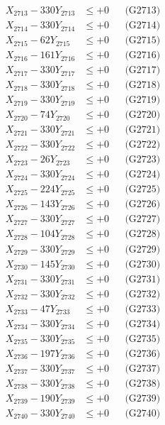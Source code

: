 \documentclass[a4paper,10pt]{article}
\begin{document}
{\begin{align}
X_{2713} - 330Y_{2713} &\leq +0 && \text{(G2713)} \\
X_{2714} - 330Y_{2714} &\leq +0 && \text{(G2714)} \\
X_{2715} - 62Y_{2715} &\leq +0 && \text{(G2715)} \\
X_{2716} - 161Y_{2716} &\leq +0 && \text{(G2716)} \\
X_{2717} - 330Y_{2717} &\leq +0 && \text{(G2717)} \\
X_{2718} - 330Y_{2718} &\leq +0 && \text{(G2718)} \\
X_{2719} - 330Y_{2719} &\leq +0 && \text{(G2719)} \\
X_{2720} - 74Y_{2720} &\leq +0 && \text{(G2720)} \\
\allowbreak
X_{2721} - 330Y_{2721} &\leq +0 && \text{(G2721)} \\
X_{2722} - 330Y_{2722} &\leq +0 && \text{(G2722)} \\
X_{2723} - 26Y_{2723} &\leq +0 && \text{(G2723)} \\
X_{2724} - 330Y_{2724} &\leq +0 && \text{(G2724)} \\
X_{2725} - 224Y_{2725} &\leq +0 && \text{(G2725)} \\
X_{2726} - 143Y_{2726} &\leq +0 && \text{(G2726)} \\
X_{2727} - 330Y_{2727} &\leq +0 && \text{(G2727)} \\
X_{2728} - 104Y_{2728} &\leq +0 && \text{(G2728)} \\
X_{2729} - 330Y_{2729} &\leq +0 && \text{(G2729)} \\
X_{2730} - 145Y_{2730} &\leq +0 && \text{(G2730)} \\
\allowbreak
X_{2731} - 330Y_{2731} &\leq +0 && \text{(G2731)} \\
X_{2732} - 330Y_{2732} &\leq +0 && \text{(G2732)} \\
X_{2733} - 47Y_{2733} &\leq +0 && \text{(G2733)} \\
X_{2734} - 330Y_{2734} &\leq +0 && \text{(G2734)} \\
X_{2735} - 330Y_{2735} &\leq +0 && \text{(G2735)} \\
X_{2736} - 197Y_{2736} &\leq +0 && \text{(G2736)} \\
X_{2737} - 330Y_{2737} &\leq +0 && \text{(G2737)} \\
X_{2738} - 330Y_{2738} &\leq +0 && \text{(G2738)} \\
X_{2739} - 190Y_{2739} &\leq +0 && \text{(G2739)} \\
X_{2740} - 330Y_{2740} &\leq +0 && \text{(G2740)} \\

\end{align}}
\end{document}
